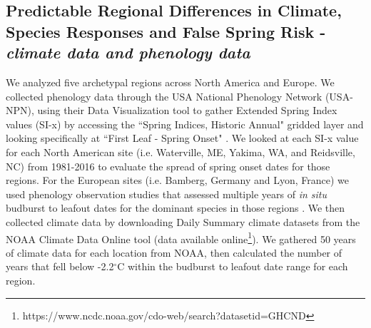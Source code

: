 \documentclass{article}\usepackage[]{graphicx}\usepackage[]{color}
\begin{document}
\subsection*{Predictable Regional Differences in Climate, Species Responses and False Spring Risk - \textit{climate data and phenology data}}
We analyzed five archetypal regions across North America and Europe. We collected phenology data through the USA National Phenology Network (USA-NPN), using their Data Visualization tool to gather Extended Spring Index values (SI-x) by accessing the ``Spring Indices, Historic Annual" gridded layer and looking specifically at ``First Leaf - Spring Onset" \citep{SI-x2016}. We looked at each SI-x value for each North American site (i.e. Waterville, ME, Yakima, WA, and Reidsville, NC) from 1981-2016 to evaluate the spread of spring onset dates for those regions. For the European sites (i.e. Bamberg, Germany and Lyon, France) we used phenology observation studies that assessed multiple years of \textit{in situ} budburst to leafout dates for the dominant species in those regions \citep{Soudani2012, White2009,Schaber2005}. We then collected climate data by downloading Daily Summary climate datasets from the NOAA Climate Data Online tool (data available online\footnote{https://www.ncdc.noaa.gov/cdo-web/search?datasetid=GHCND}). We gathered 50 years of climate data for each location from NOAA, then calculated the number of years that fell below -2.2$^{\circ}$C within the budburst to leafout date range for each region. %

\newpage
\nocite{Flynn}

\end{document}
